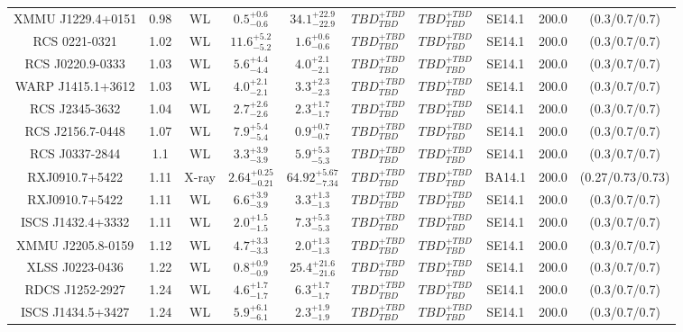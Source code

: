 \begin{table}
\begin{tabular}{cccccccccc}
XMMU J1229.4+0151 & 0.98 & WL & ${0.5}^{+0.6}_{-0.6}$ & ${34.1}^{+22.9}_{-22.9}$ & ${TBD}^{+TBD}_{TBD}$ & ${TBD}^{+TBD}_{TBD}$ & SE14.1 & 200.0 & (0.3/0.7/0.7) \\
RCS 0221-0321 & 1.02 & WL & ${11.6}^{+5.2}_{-5.2}$ & ${1.6}^{+0.6}_{-0.6}$ & ${TBD}^{+TBD}_{TBD}$ & ${TBD}^{+TBD}_{TBD}$ & SE14.1 & 200.0 & (0.3/0.7/0.7) \\
RCS J0220.9-0333 & 1.03 & WL & ${5.6}^{+4.4}_{-4.4}$ & ${4.0}^{+2.1}_{-2.1}$ & ${TBD}^{+TBD}_{TBD}$ & ${TBD}^{+TBD}_{TBD}$ & SE14.1 & 200.0 & (0.3/0.7/0.7) \\
WARP J1415.1+3612 & 1.03 & WL & ${4.0}^{+2.1}_{-2.1}$ & ${3.3}^{+2.3}_{-2.3}$ & ${TBD}^{+TBD}_{TBD}$ & ${TBD}^{+TBD}_{TBD}$ & SE14.1 & 200.0 & (0.3/0.7/0.7) \\
RCS J2345-3632 & 1.04 & WL & ${2.7}^{+2.6}_{-2.6}$ & ${2.3}^{+1.7}_{-1.7}$ & ${TBD}^{+TBD}_{TBD}$ & ${TBD}^{+TBD}_{TBD}$ & SE14.1 & 200.0 & (0.3/0.7/0.7) \\
RCS J2156.7-0448 & 1.07 & WL & ${7.9}^{+5.4}_{-5.4}$ & ${0.9}^{+0.7}_{-0.7}$ & ${TBD}^{+TBD}_{TBD}$ & ${TBD}^{+TBD}_{TBD}$ & SE14.1 & 200.0 & (0.3/0.7/0.7) \\
RCS J0337-2844 & 1.1 & WL & ${3.3}^{+3.9}_{-3.9}$ & ${5.9}^{+5.3}_{-5.3}$ & ${TBD}^{+TBD}_{TBD}$ & ${TBD}^{+TBD}_{TBD}$ & SE14.1 & 200.0 & (0.3/0.7/0.7) \\
RXJ0910.7+5422 & 1.11 & X-ray & ${2.64}^{+0.25}_{-0.21}$ & ${64.92}^{+5.67}_{-7.34}$ & ${TBD}^{+TBD}_{TBD}$ & ${TBD}^{+TBD}_{TBD}$ & BA14.1 & 200.0 & (0.27/0.73/0.73) \\
RXJ0910.7+5422 & 1.11 & WL & ${6.6}^{+3.9}_{-3.9}$ & ${3.3}^{+1.3}_{-1.3}$ & ${TBD}^{+TBD}_{TBD}$ & ${TBD}^{+TBD}_{TBD}$ & SE14.1 & 200.0 & (0.3/0.7/0.7) \\
ISCS J1432.4+3332 & 1.11 & WL & ${2.0}^{+1.5}_{-1.5}$ & ${7.3}^{+5.3}_{-5.3}$ & ${TBD}^{+TBD}_{TBD}$ & ${TBD}^{+TBD}_{TBD}$ & SE14.1 & 200.0 & (0.3/0.7/0.7) \\
XMMU J2205.8-0159 & 1.12 & WL & ${4.7}^{+3.3}_{-3.3}$ & ${2.0}^{+1.3}_{-1.3}$ & ${TBD}^{+TBD}_{TBD}$ & ${TBD}^{+TBD}_{TBD}$ & SE14.1 & 200.0 & (0.3/0.7/0.7) \\
XLSS J0223-0436 & 1.22 & WL & ${0.8}^{+0.9}_{-0.9}$ & ${25.4}^{+21.6}_{-21.6}$ & ${TBD}^{+TBD}_{TBD}$ & ${TBD}^{+TBD}_{TBD}$ & SE14.1 & 200.0 & (0.3/0.7/0.7) \\
RDCS J1252-2927 & 1.24 & WL & ${4.6}^{+1.7}_{-1.7}$ & ${6.3}^{+1.7}_{-1.7}$ & ${TBD}^{+TBD}_{TBD}$ & ${TBD}^{+TBD}_{TBD}$ & SE14.1 & 200.0 & (0.3/0.7/0.7) \\
ISCS J1434.5+3427 & 1.24 & WL & ${5.9}^{+6.1}_{-6.1}$ & ${2.3}^{+1.9}_{-1.9}$ & ${TBD}^{+TBD}_{TBD}$ & ${TBD}^{+TBD}_{TBD}$ & SE14.1 & 200.0 & (0.3/0.7/0.7) \\

\end{tabular}
\end{table}
